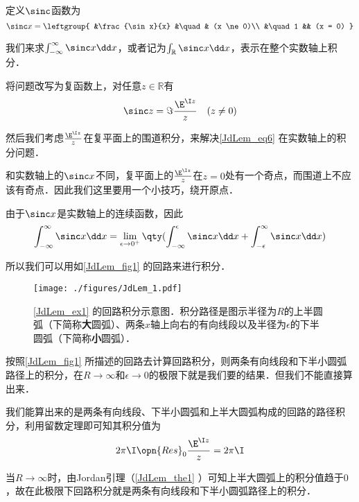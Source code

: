 \begin{example}{}\label{JdLem_ex1}

定义$\sinc$函数为
\begin{equation}
\sinc x = 
\leftgroup{
&\frac{\sin x}{x} &\quad & (x \ne 0)\\
&\quad 1 && (x = 0)
}\end{equation}

我们来求$\int_{-\infty}^{\infty}\sinc x\dd x$，或者记为$\int_{\mathbb{R}}\sinc x \dd x$，表示在整个实数轴上积分．

将问题改写为复函数上，对任意$z\in\mathbb{R}$有
\begin{equation}\label{JdLem_eq6}
\sinc z = \Im \frac{\E^{\I z}}{z} \quad  (z \ne 0)
\end{equation}

然后我们考虑$\frac{\E^{\I z}}{z}$在复平面上的围道积分，来解决\autoref{JdLem_eq6} 在实数轴上的积分问题．

和实数轴上的$\sinc x$不同，复平面上的$\frac{\E^{\I z}}{z}$在$z=0$处有一个奇点，而围道上不应该有奇点．因此我们这里要用一个小技巧，绕开原点．

由于$\sinc x$是实数轴上的连续函数，因此
\begin{equation}
\int_{-\infty}^\infty \sinc x \dd x=\lim\limits_{\epsilon\to 0^+}\qty(\int_{-\infty}^\epsilon \sinc x \dd x+\int_{-\epsilon}^\infty \sinc x \dd x)
\end{equation}

所以我们可以用如\autoref{JdLem_fig1} 的回路来进行积分．

\begin{figure}[ht]
\centering
\texttt{[image: ./figures/JdLem\_1.pdf]}
\caption{\autoref{JdLem_ex1} 的回路积分示意图．积分路径是图示半径为$R$的上半圆弧（下简称\textbf{大}圆弧）、两条$x$轴上向右的有向线段以及半径为$\epsilon$的下半圆弧（下简称\textbf{小}圆弧）．} \label{JdLem_fig1}
\end{figure}

按照\autoref{JdLem_fig1} 所描述的回路去计算回路积分，则两条有向线段和下半小圆弧路径上的积分，在$R\to\infty$和$\epsilon\to 0$的极限下就是我们要的结果．但我们不能直接算出来．

我们能算出来的是两条有向线段、下半小圆弧和上半大圆弧构成的回路的路径积分，利用留数定理即可知其积分值为
\begin{equation}\label{JdLem_eq7}
2\pi\I\opn{Res}_0\frac{\E^{\I z}}{z}=2\pi\I
\end{equation}

当$R\to \infty$时，由Jordan引理（\autoref{JdLem_the1} ）可知上半大圆弧上的积分值趋于$0$，故在此极限下回路积分就是两条有向线段和下半小圆弧路径上的积分．


\end{example}
